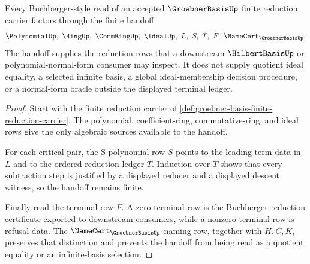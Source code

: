 \begin{theorem}
\label{thm:groebner-basis-buchberger-handoff}
Every Buchberger-style read of an accepted $\GroebnerBasisUp$ finite reduction carrier factors through the finite handoff
$$
\PolynomialUp,\ \RingUp,\ \CommRingUp,\ \IdealUp,\ L,\ S,\ T,\ F,\ \NameCert_{\GroebnerBasisUp}.
$$
The handoff supplies the reduction rows that a downstream $\HilbertBasisUp$ or polynomial-normal-form consumer may inspect. It does not supply quotient ideal equality, a selected infinite basis, a global ideal-membership decision procedure, or a normal-form oracle outside the displayed terminal ledger.
\end{theorem}
\begin{proof}
Start with the finite reduction carrier of \autoref{def:groebner-basis-finite-reduction-carrier}. The polynomial, coefficient-ring, commutative-ring, and ideal rows give the only algebraic sources available to the handoff.

For each critical pair, the S-polynomial row $S$ points to the leading-term data in $L$ and to the ordered reduction ledger $T$. Induction over $T$ shows that every subtraction step is justified by a displayed reducer and a displayed descent witness, so the handoff remains finite.

Finally read the terminal row $F$. A zero terminal row is the Buchberger reduction certificate exported to downstream consumers, while a nonzero terminal row is refusal data. The $\NameCert_{\GroebnerBasisUp}$ naming row, together with $H,C,K$, preserves that distinction and prevents the handoff from being read as a quotient equality or an infinite-basis selection.
\end{proof}

